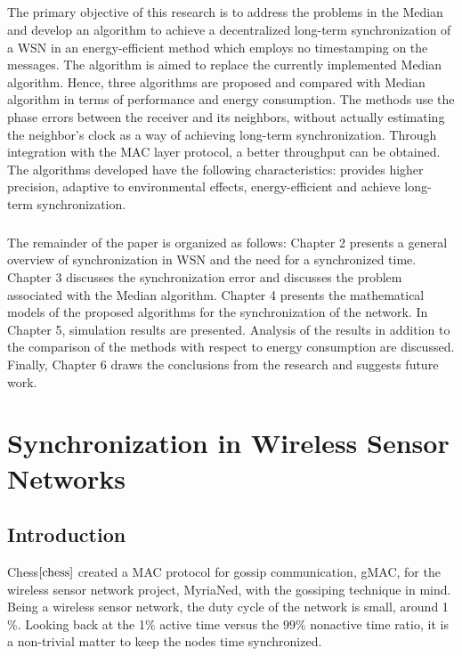 \documentclass[a4paper,10pt]{report}
\begin{document}
\paragraph*{}
The primary objective of this research is to address the problems in the Median and develop an algorithm to achieve a decentralized long-term synchronization of a WSN in an energy-efficient method which employs no timestamping on the messages. The algorithm is aimed to replace the currently implemented Median algorithm.  Hence, three algorithms are proposed and compared with Median algorithm in terms of performance and energy consumption. The methods use the phase errors between the receiver and its neighbors, without actually estimating the neighbor's clock as a way of achieving long-term synchronization. Through integration with the MAC layer protocol, a better throughput can be obtained. The algorithms developed have the following characteristics: provides higher precision, adaptive to environmental effects, energy-efficient and achieve long-term synchronization.
\paragraph*{} The remainder of the paper is organized as follows:  Chapter 2 presents a general overview of synchronization in WSN and the need for a synchronized time. Chapter 3 discusses the synchronization error and discusses the problem associated with the Median algorithm. Chapter 4 presents the mathematical models of the proposed algorithms for the synchronization of the network. In Chapter 5, simulation results are presented. Analysis of the results in addition to the comparison of the methods with respect to energy consumption are discussed. Finally, Chapter 6 draws the conclusions from the research and suggests future work.
\chapter{\textbf{Synchronization in Wireless Sensor Networks}}
\section{\textbf{Introduction}}
Chess$\cite{chess}$ created a MAC protocol for gossip communication, gMAC, for the wireless sensor network project, MyriaNed, with the gossiping technique in mind. Being a wireless sensor network, the duty cycle of the network is small, around 1$\%$. Looking back at the 1$\%$ active time versus the $99\%$ nonactive time ratio, it is a non-trivial matter to keep the nodes time synchronized.
\end{document}
